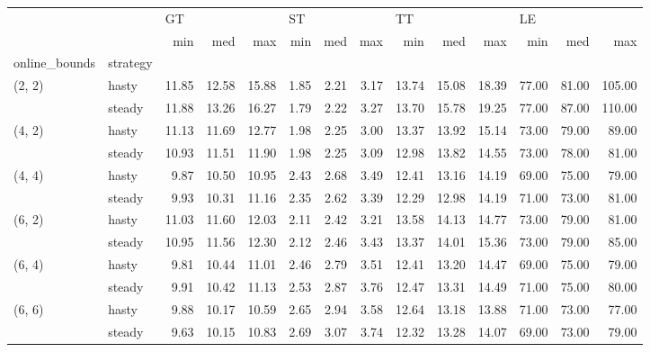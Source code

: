 \begin{tabular}{llrrrrrrrrrrrr}
\toprule
       &        & \multicolumn{3}{l}{GT} & \multicolumn{3}{l}{ST} & \multicolumn{3}{l}{TT} & \multicolumn{3}{l}{LE} \\
       &        &   min &   med &   max &  min &  med &  max &   min &   med &   max &   min &   med &    max \\
online\_bounds & strategy &       &       &       &      &      &      &       &       &       &       &       &        \\
\midrule
(2, 2) & hasty & 11.85 & 12.58 & 15.88 & 1.85 & 2.21 & 3.17 & 13.74 & 15.08 & 18.39 & 77.00 & 81.00 & 105.00 \\
       & steady & 11.88 & 13.26 & 16.27 & 1.79 & 2.22 & 3.27 & 13.70 & 15.78 & 19.25 & 77.00 & 87.00 & 110.00 \\
(4, 2) & hasty & 11.13 & 11.69 & 12.77 & 1.98 & 2.25 & 3.00 & 13.37 & 13.92 & 15.14 & 73.00 & 79.00 &  89.00 \\
       & steady & 10.93 & 11.51 & 11.90 & 1.98 & 2.25 & 3.09 & 12.98 & 13.82 & 14.55 & 73.00 & 78.00 &  81.00 \\
(4, 4) & hasty &  9.87 & 10.50 & 10.95 & 2.43 & 2.68 & 3.49 & 12.41 & 13.16 & 14.19 & 69.00 & 75.00 &  79.00 \\
       & steady &  9.93 & 10.31 & 11.16 & 2.35 & 2.62 & 3.39 & 12.29 & 12.98 & 14.19 & 71.00 & 73.00 &  81.00 \\
(6, 2) & hasty & 11.03 & 11.60 & 12.03 & 2.11 & 2.42 & 3.21 & 13.58 & 14.13 & 14.77 & 73.00 & 79.00 &  81.00 \\
       & steady & 10.95 & 11.56 & 12.30 & 2.12 & 2.46 & 3.43 & 13.37 & 14.01 & 15.36 & 73.00 & 79.00 &  85.00 \\
(6, 4) & hasty &  9.81 & 10.44 & 11.01 & 2.46 & 2.79 & 3.51 & 12.41 & 13.20 & 14.47 & 69.00 & 75.00 &  79.00 \\
       & steady &  9.91 & 10.42 & 11.13 & 2.53 & 2.87 & 3.76 & 12.47 & 13.31 & 14.49 & 71.00 & 75.00 &  80.00 \\
(6, 6) & hasty &  9.88 & 10.17 & 10.59 & 2.65 & 2.94 & 3.58 & 12.64 & 13.18 & 13.88 & 71.00 & 73.00 &  77.00 \\
       & steady &  9.63 & 10.15 & 10.83 & 2.69 & 3.07 & 3.74 & 12.32 & 13.28 & 14.07 & 69.00 & 73.00 &  79.00 \\
\bottomrule
\end{tabular}
